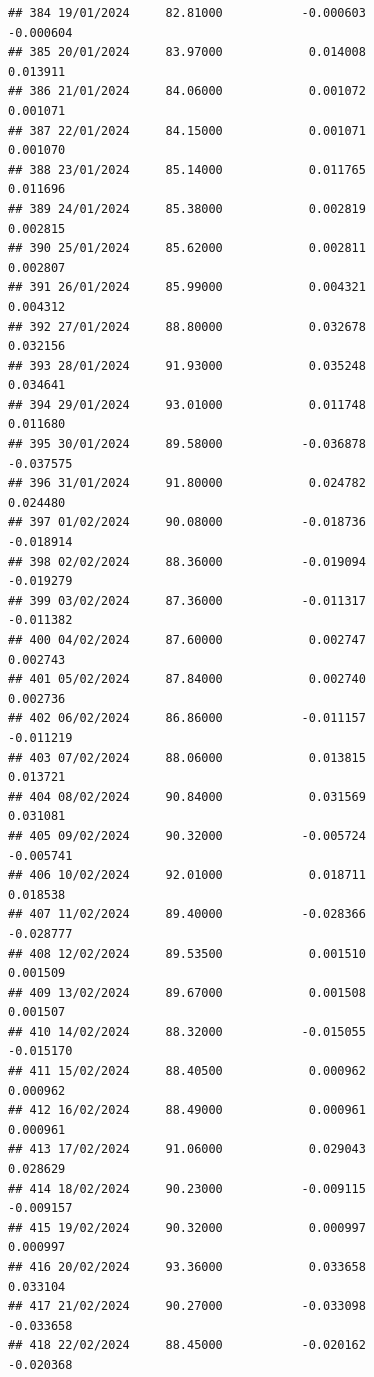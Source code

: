 \documentclass[
]{article}
\begin{document}
\begin{verbatim}
## 384 19/01/2024     82.81000           -0.000603               -0.000604
## 385 20/01/2024     83.97000            0.014008                0.013911
## 386 21/01/2024     84.06000            0.001072                0.001071
## 387 22/01/2024     84.15000            0.001071                0.001070
## 388 23/01/2024     85.14000            0.011765                0.011696
## 389 24/01/2024     85.38000            0.002819                0.002815
## 390 25/01/2024     85.62000            0.002811                0.002807
## 391 26/01/2024     85.99000            0.004321                0.004312
## 392 27/01/2024     88.80000            0.032678                0.032156
## 393 28/01/2024     91.93000            0.035248                0.034641
## 394 29/01/2024     93.01000            0.011748                0.011680
## 395 30/01/2024     89.58000           -0.036878               -0.037575
## 396 31/01/2024     91.80000            0.024782                0.024480
## 397 01/02/2024     90.08000           -0.018736               -0.018914
## 398 02/02/2024     88.36000           -0.019094               -0.019279
## 399 03/02/2024     87.36000           -0.011317               -0.011382
## 400 04/02/2024     87.60000            0.002747                0.002743
## 401 05/02/2024     87.84000            0.002740                0.002736
## 402 06/02/2024     86.86000           -0.011157               -0.011219
## 403 07/02/2024     88.06000            0.013815                0.013721
## 404 08/02/2024     90.84000            0.031569                0.031081
## 405 09/02/2024     90.32000           -0.005724               -0.005741
## 406 10/02/2024     92.01000            0.018711                0.018538
## 407 11/02/2024     89.40000           -0.028366               -0.028777
## 408 12/02/2024     89.53500            0.001510                0.001509
## 409 13/02/2024     89.67000            0.001508                0.001507
## 410 14/02/2024     88.32000           -0.015055               -0.015170
## 411 15/02/2024     88.40500            0.000962                0.000962
## 412 16/02/2024     88.49000            0.000961                0.000961
## 413 17/02/2024     91.06000            0.029043                0.028629
## 414 18/02/2024     90.23000           -0.009115               -0.009157
## 415 19/02/2024     90.32000            0.000997                0.000997
## 416 20/02/2024     93.36000            0.033658                0.033104
## 417 21/02/2024     90.27000           -0.033098               -0.033658
## 418 22/02/2024     88.45000           -0.020162               -0.020368

\end{verbatim}
\end{document}

